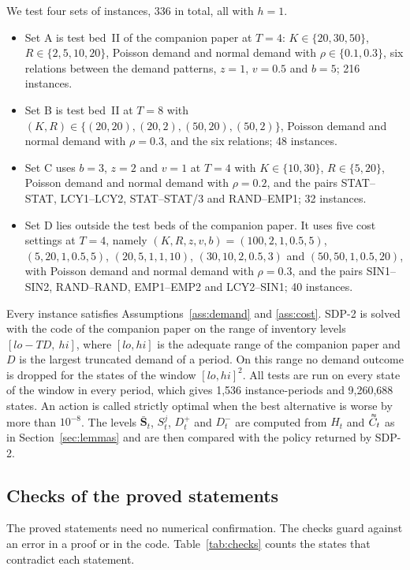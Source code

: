 \documentclass[11pt]{article}
\DeclareRobustCommand{\dbtilde}[1]{\accentset{\approx}{#1}}
\renewcommand{\vec}[1]{\boldsymbol{#1}}
\newcommand{\Cq}{\dbtilde{C}}
\theoremstyle{definition}
\begin{document}
We test four sets of instances, 336 in total, all with $h=1$.
\begin{itemize}
\item Set A is test bed~II of the companion paper at $T=4$: $K\in\{20,30,50\}$, $R\in\{2,5,10,20\}$, Poisson demand and normal demand with $\rho\in\{0.1,0.3\}$, six relations between the demand patterns, $z=1$, $v=0.5$ and $b=5$; 216 instances.
\item Set B is test bed~II at $T=8$ with $(K,R)\in\{(20,20),(20,2),(50,20),(50,2)\}$, Poisson demand and normal demand with $\rho=0.3$, and the six relations; 48 instances.
\item Set C uses $b=3$, $z=2$ and $v=1$ at $T=4$ with $K\in\{10,30\}$, $R\in\{5,20\}$, Poisson demand and normal demand with $\rho=0.2$, and the pairs STAT--STAT, LCY1--LCY2, STAT--STAT/3 and RAND--EMP1; 32 instances.
\item Set D lies outside the test beds of the companion paper. It uses five cost settings at $T=4$, namely $(K,R,z,v,b)=(100,2,1,0.5,5)$, $(5,20,1,0.5,5)$, $(20,5,1,1,10)$, $(30,10,2,0.5,3)$ and $(50,50,1,0.5,20)$, with Poisson demand and normal demand with $\rho=0.3$, and the pairs SIN1--SIN2, RAND--RAND, EMP1--EMP2 and LCY2--SIN1; 40 instances.
\end{itemize}
Every instance satisfies Assumptions~\ref{ass:demand} and \ref{ass:cost}. SDP-2 is solved with the code of the companion paper on the range of inventory levels $[lo-TD,\ hi]$, where $[lo,hi]$ is the adequate range of the companion paper and $D$ is the largest truncated demand of a period. On this range no demand outcome is dropped for the states of the window $[lo,hi]^2$. All tests are run on every state of the window in every period, which gives 1,536 instance-periods and 9,260,688 states. An action is called strictly optimal when the best alternative is worse by more than $10^{-8}$. The levels $\bar{\vec{S}}_t$, $S^j_t$, $D^+_t$ and $D^-_t$ are computed from $H_t$ and $\Cq_t$ as in Section~\ref{sec:lemmas} and are then compared with the policy returned by SDP-2.

\subsection{Checks of the proved statements}

The proved statements need no numerical confirmation. The checks guard against an error in a proof or in the code. Table~\ref{tab:checks} counts the states that contradict each statement.
\end{document}
